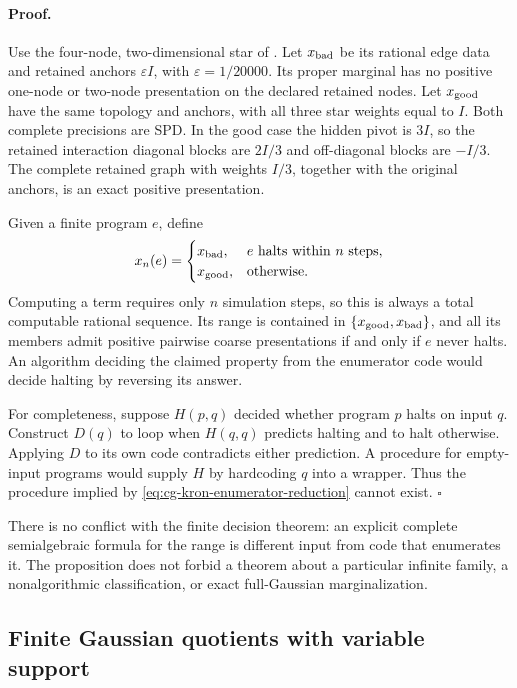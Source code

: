 \paragraph{Proof.}
Use the four-node, two-dimensional star of
. Let
\(x_{\rm bad}\) be its rational edge data and retained
anchors \(\varepsilon I\), with \(\varepsilon=1/20000\).
Its proper marginal has no positive one-node or two-node
presentation on the declared retained nodes. Let
\(x_{\rm good}\) have the same topology and anchors, with
all three star weights equal to \(I\). Both complete
precisions are SPD. In the good case the hidden pivot is
\(3I\), so the retained interaction diagonal blocks are
\(2I/3\) and off-diagonal blocks are \(-I/3\). The
complete retained graph with weights \(I/3\), together
with the original anchors, is an exact positive presentation.

Given a finite program \(e\), define
\begin{equation}
x_n(e)=
\begin{cases}
x_{\rm bad},&e\text{ halts within }n\text{ steps},\\
x_{\rm good},&\text{otherwise}.
\end{cases}
\label{eq:cg-kron-enumerator-reduction}
\end{equation}
Computing a term requires only \(n\) simulation steps,
so this is always a total computable rational sequence.
Its range is contained in
\(\{x_{\rm good},x_{\rm bad}\}\), and all its members
admit positive pairwise coarse presentations if and
only if \(e\) never halts. An algorithm deciding the
claimed property from the enumerator code would decide
halting by reversing its answer.

For completeness, suppose \(H(p,q)\) decided whether
program \(p\) halts on input \(q\). Construct \(D(q)\)
to loop when \(H(q,q)\) predicts halting and to halt
otherwise. Applying \(D\) to its own code contradicts
either prediction. A procedure for empty-input programs
would supply \(H\) by hardcoding \(q\) into a wrapper.
Thus the procedure implied by
\eqref{eq:cg-kron-enumerator-reduction} cannot exist.
\(\square\)

There is no conflict with the finite decision theorem:
an explicit complete semialgebraic formula for the range
is different input from code that enumerates it.
The proposition does not forbid a theorem about a
particular infinite family, a nonalgorithmic
classification, or exact full-Gaussian marginalization.

\subsection{Finite Gaussian quotients with variable support}
\label{sec:cg-variable-support-quotients}

